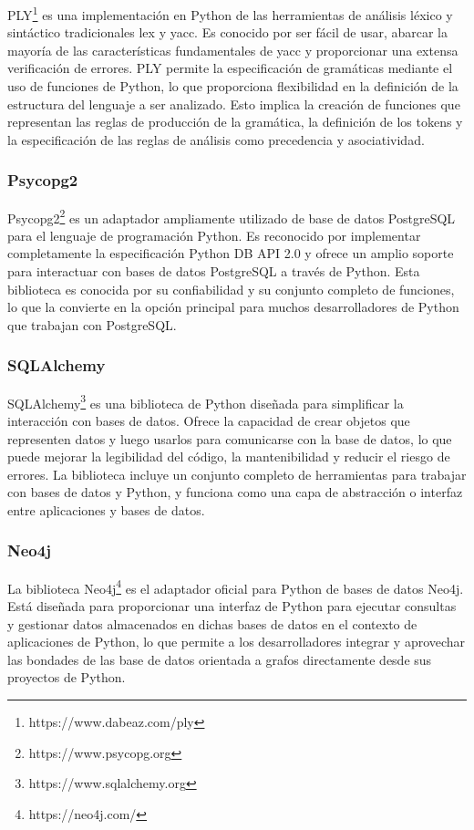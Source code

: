 PLY\footnote{https://www.dabeaz.com/ply} es una implementación en Python de las 
herramientas de análisis léxico y sintáctico 
tradicionales lex y yacc. Es conocido por ser fácil de usar,
abarcar la mayoría de las características fundamentales de yacc y proporcionar una extensa verificación de errores. 
PLY permite la especificación de gramáticas 
mediante el uso de funciones de Python, lo que proporciona flexibilidad en la definición de la estructura del 
lenguaje a ser analizado. Esto implica la creación de funciones que representan las reglas de producción de la 
gramática, la definición de los tokens y la especificación de las reglas de 
análisis como precedencia y asociatividad.

\subsubsection{Psycopg2}

Psycopg2\footnote{https://www.psycopg.org} es un adaptador ampliamente utilizado de base de datos PostgreSQL 
para el lenguaje de programación 
Python. Es reconocido por implementar completamente la especificación Python DB API 2.0 y ofrece un amplio 
soporte para interactuar con bases de datos PostgreSQL a través de Python. Esta biblioteca es conocida por 
su confiabilidad y su conjunto completo de funciones, lo que la convierte en la opción principal para muchos 
desarrolladores de Python que trabajan con PostgreSQL.

\subsubsection{SQLAlchemy}

SQLAlchemy\footnote{https://www.sqlalchemy.org} es una biblioteca de Python diseñada para simplificar la 
interacción con bases de datos. Ofrece la 
capacidad de crear objetos que representen datos y luego usarlos para comunicarse con la base de datos, lo que 
puede mejorar la legibilidad del código, la mantenibilidad y reducir el riesgo de errores. La biblioteca incluye 
un conjunto completo de herramientas para trabajar con bases de datos y Python, y funciona como una capa de 
abstracción o interfaz entre aplicaciones y bases de datos. 

\subsubsection{Neo4j}

La biblioteca Neo4j\footnote{https://neo4j.com/} es el adaptador oficial para Python de bases de datos Neo4j. Está 
diseñada para proporcionar una 
interfaz de Python para ejecutar 
consultas y gestionar datos almacenados en dichas bases de datos en el contexto de aplicaciones de Python, lo que permite 
a los desarrolladores integrar y aprovechar las bondades de las base de datos orientada a grafos directamente desde sus 
proyectos de Python.

